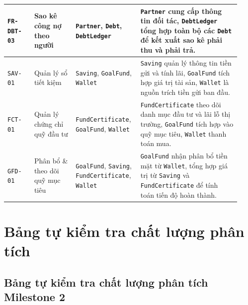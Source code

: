 \documentclass[11pt,a4paper]{article}
\newcommand{\code}[1]{\texttt{#1}}
\newenvironment{smalltable}{\begingroup\footnotesize\renewcommand{\arraystretch}{1.25}\setlength{\tabcolsep}{3pt}}{\endgroup}
\begin{document}
\begin{smalltable}
\begin{longtable}{|L{0.11\linewidth}|L{0.17\linewidth}|L{0.24\linewidth}|L{0.41\linewidth}|}
\code{FR-DBT-03} & Sao kê công nợ theo người & \code{Partner}, \code{Debt}, \code{DebtLedger} & \code{Partner} cung cấp thông tin đối tác, \code{DebtLedger} tổng hợp toàn bộ các \code{Debt} để kết xuất sao kê phải thu và phải trả. \\ \hline
\code{SAV-01} & Quản lý sổ tiết kiệm & \code{Saving}, \code{GoalFund}, \code{Wallet} & \code{Saving} quản lý thông tin tiền gửi và tính lãi, \code{GoalFund} tích hợp giá trị tài sản, \code{Wallet} là nguồn trích tiền gửi ban đầu. \\ \hline
\code{FCT-01} & Quản lý chứng chỉ quỹ đầu tư & \code{FundCertificate}, \code{GoalFund}, \code{Wallet} & \code{FundCertificate} theo dõi danh mục đầu tư và lãi lỗ thị trường, \code{GoalFund} tích hợp vào quỹ mục tiêu, \code{Wallet} thanh toán mua. \\ \hline
\code{GFD-01} & Phân bổ \& theo dõi quỹ mục tiêu & \code{GoalFund}, \code{Saving}, \code{FundCertificate}, \code{Wallet} & \code{GoalFund} nhận phân bổ tiền mặt từ \code{Wallet}, tổng hợp giá trị từ \code{Saving} và \code{FundCertificate} để tính toán tiến độ hoàn thành. \\ \hline
\end{longtable}
\end{smalltable}

\section{Bảng tự kiểm tra chất lượng phân tích}

\subsection{Bảng tự kiểm tra chất lượng phân tích Milestone 2}
\end{document}

